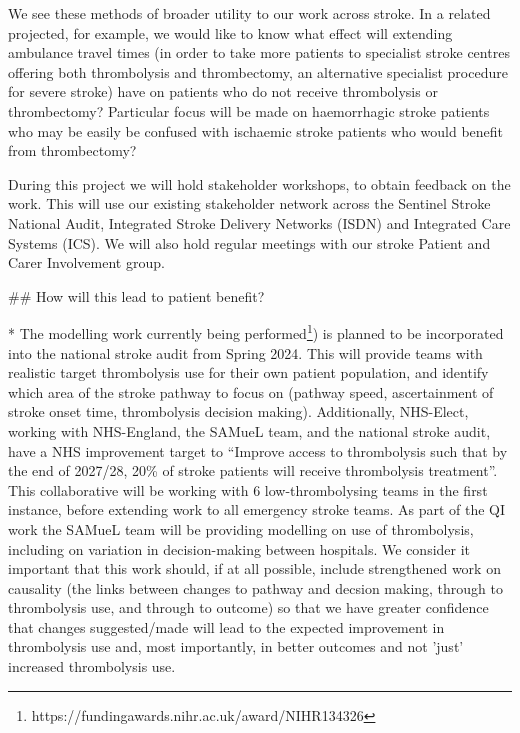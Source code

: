 \begin{markdown}
We see these methods of broader utility to our work across stroke. In a related projected, for example, we would like to know what effect will extending ambulance travel times (in order to take more patients to specialist stroke centres offering both thrombolysis and thrombectomy, an alternative specialist procedure for severe stroke) have on patients who do not receive thrombolysis or thrombectomy? Particular focus will be made on haemorrhagic stroke patients who may be easily be confused with ischaemic stroke patients who would benefit from thrombectomy?

During this project we will hold stakeholder workshops, to obtain feedback on the work. This will use our existing stakeholder network across the Sentinel Stroke National Audit, Integrated Stroke Delivery Networks (ISDN) and Integrated Care Systems (ICS). We will also hold regular meetings with our stroke Patient and Carer Involvement group.

## How will this lead to patient benefit?

* The modelling work currently being performed\footnote{https://fundingawards.nihr.ac.uk/award/NIHR134326}) is planned to be incorporated into the national stroke audit from Spring 2024. This will provide teams with realistic target thrombolysis use for their own patient population, and identify which area of the stroke pathway to focus on (pathway speed, ascertainment of stroke onset time, thrombolysis decision making). Additionally, NHS-Elect, working with NHS-England, the SAMueL team, and the national stroke audit, have a NHS improvement target to “Improve access to thrombolysis such that by the end of 2027/28, 20\% of stroke patients will receive thrombolysis treatment”. This collaborative will be working with 6 low-thrombolysing teams in the first instance, before extending work to all emergency stroke teams. As part of the QI work the SAMueL team will be providing modelling on use of thrombolysis, including on variation in decision-making between hospitals. We consider it important that this work should, if at all possible, include strengthened work on causality (the links between changes to pathway and decsion making, through to thrombolysis use, and through to outcome) so that we have greater confidence that changes suggested/made will lead to the expected improvement in thrombolysis use and, most importantly, in better outcomes and not 'just' increased thrombolysis use.


\end{markdown}
